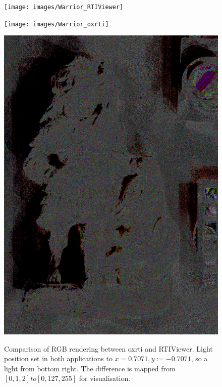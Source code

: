 \begin{figure}
\begin{subfloat}{\texttt{[image: images/Warrior\_RTIViewer]}}\end{subfloat}
\begin{subfloat}{\texttt{[image: images/Warrior\_oxrti]}}\end{subfloat}
\begin{subfloat}{\includegraphics[max width=0.32\linewidth]{images/Warrior_diff}}\end{subfloat}

\caption[Warrior Comparison]{Comparison of RGB rendering between oxrti and RTIViewer. Light position
set in both applications to $x=0.7071, y:=-0.7071$, so a light from bottom
right. The difference is mapped from $[0,1,2] to [0,127,255]$
for visualisation.}
\label{compare1}
\end{figure}

